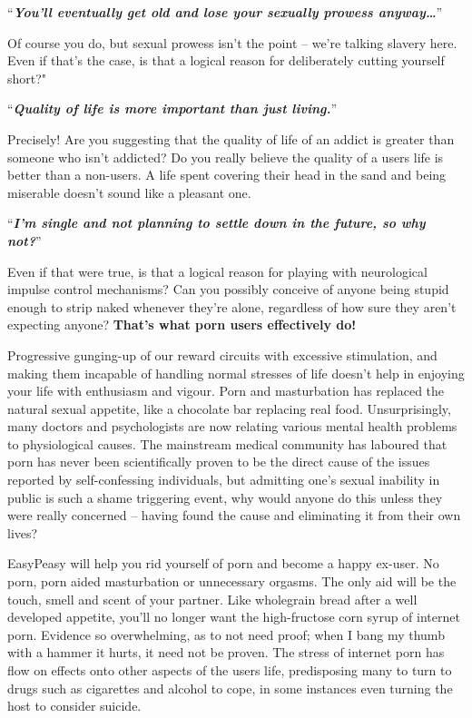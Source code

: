 \documentclass[
]{book}
\begin{document}
``\textbf{\emph{You'll eventually get old and lose your sexually prowess anyway\ldots{}}}''

Of course you do, but sexual prowess isn't the point -- we're talking slavery here. Even if that's the case, is that a logical reason for deliberately cutting yourself short?"

``\textbf{\emph{Quality of life is more important than just living.}}''

Precisely! Are you suggesting that the quality of life of an addict is greater than someone who isn't addicted? Do you really believe the quality of a users life is better than a non-users. A life spent covering their head in the sand and being miserable doesn't sound like a pleasant one.

``\textbf{\emph{I'm single and not planning to settle down in the future, so why not?}}''

Even if that were true, is that a logical reason for playing with neurological impulse control mechanisms? Can you possibly conceive of anyone being stupid enough to strip naked whenever they're alone, regardless of how sure they aren't expecting anyone? \textbf{That's what porn users effectively do!}

Progressive gunging-up of our reward circuits with excessive stimulation, and making them incapable of handling normal stresses of life doesn't help in enjoying your life with enthusiasm and vigour. Porn and masturbation has replaced the natural sexual appetite, like a chocolate bar replacing real food. Unsurprisingly, many doctors and psychologists are now relating various mental health problems to physiological causes. The mainstream medical community has laboured that porn has never been scientifically proven to be the direct cause of the issues reported by self-confessing individuals, but admitting one's sexual inability in public is such a shame triggering event, why would anyone do this unless they were really concerned -- having found the cause and eliminating it from their own lives?

EasyPeasy will help you rid yourself of porn and become a happy ex-user. No porn, porn aided masturbation or unnecessary orgasms. The only aid will be the touch, smell and scent of your partner. Like wholegrain bread after a well developed appetite, you'll no longer want the high-fructose corn syrup of internet porn. Evidence so overwhelming, as to not need proof; when I bang my thumb with a hammer it hurts, it need not be proven. The stress of internet porn has flow on effects onto other aspects of the users life, predisposing many to turn to drugs such as cigarettes and alcohol to cope, in some instances even turning the host to consider suicide.
\end{document}
